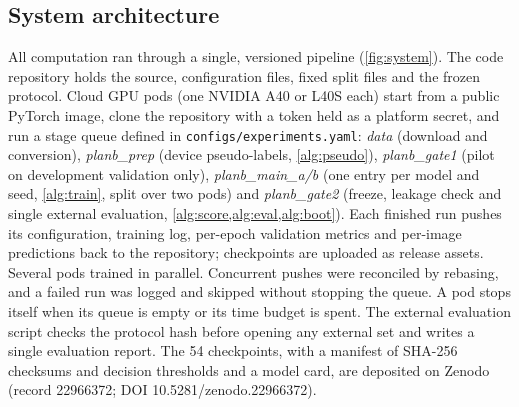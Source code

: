 \documentclass[final,3p]{elsarticle}
\begin{document}
\subsection{System architecture}
\label{sec:system}
All computation ran through a single, versioned pipeline (\cref{fig:system}). The code repository holds the source, configuration files, fixed split files and the frozen protocol. Cloud GPU pods (one NVIDIA A40 or L40S each) start from a public PyTorch image, clone the repository with a token held as a platform secret, and run a stage queue defined in \texttt{configs/experiments.yaml}: \emph{data} (download and conversion), \emph{planb\_prep} (device pseudo-labels, \cref{alg:pseudo}), \emph{planb\_gate1} (pilot on development validation only), \emph{planb\_main\_a/b} (one entry per model and seed, \cref{alg:train}, split over two pods) and \emph{planb\_gate2} (freeze, leakage check and single external evaluation, \cref{alg:score,alg:eval,alg:boot}). Each finished run pushes its configuration, training log, per-epoch validation metrics and per-image predictions back to the repository; checkpoints are uploaded as release assets. Several pods trained in parallel. Concurrent pushes were reconciled by rebasing, and a failed run was logged and skipped without stopping the queue. A pod stops itself when its queue is empty or its time budget is spent. The external evaluation script checks the protocol hash before opening any external set and writes a single evaluation report. The 54 checkpoints, with a manifest of SHA-256 checksums and decision thresholds and a model card, are deposited on Zenodo (record 22966372; DOI 10.5281/zenodo.22966372).
\end{document}
